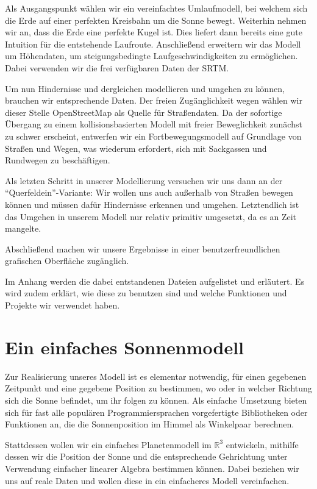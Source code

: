 \documentclass[
    paper=a4,
    DIV14,
    fontsize=12pt,
    pagesize=pdftex,
    toc=bibliographynumbered
]{scrartcl}
\numberwithin{figure}{section}
\numberwithin{equation}{section}
\numberwithin{table}{section}
\newcommand*\setR{\mathds{R}}
\begin{document}
Als Ausgangspunkt wählen wir ein vereinfachtes Umlaufmodell, bei welchem sich die Erde
auf einer perfekten Kreisbahn um die Sonne bewegt. Weiterhin nehmen wir an, dass die Erde
eine perfekte Kugel ist. Dies liefert dann bereits eine gute Intuition für die
entstehende Laufroute. Anschließend erweitern wir das Modell um Höhendaten, um
steigungsbedingte Laufgeschwindigkeiten zu ermöglichen. Dabei verwenden wir die frei
verfügbaren Daten der SRTM.

Um nun Hindernisse und dergleichen modellieren und umgehen zu können, brauchen wir
entsprechende Daten. Der freien Zugänglichkeit wegen wählen wir dieser Stelle
OpenStreetMap als Quelle für Straßendaten. Da der sofortige Übergang zu einem
kollisionsbasierten Modell mit freier Beweglichkeit zunächst zu schwer erscheint,
entwerfen wir ein Fortbewegungsmodell auf Grundlage von Straßen und Wegen, was wiederum
erfordert, sich mit Sackgassen und Rundwegen zu beschäftigen.

Als letzten Schritt in unserer Modellierung versuchen wir uns dann an der
\enquote{Querfeldein}-Variante: Wir wollen uns auch außerhalb von Straßen bewegen
können und müssen dafür Hindernisse erkennen und umgehen. Letztendlich ist das Umgehen in
unserem Modell nur relativ primitiv umgesetzt, da es an Zeit mangelte.

Abschließend machen wir unsere Ergebnisse in einer benutzerfreundlichen grafischen
Oberfläche zugänglich.

Im Anhang werden die dabei entstandenen Dateien aufgelistet und erläutert. Es wird zudem
erklärt, wie diese zu benutzen sind und welche Funktionen und Projekte wir verwendet haben.

\section{Ein einfaches Sonnenmodell}
Zur Realisierung unseres Modell ist es elementar notwendig, für einen gegebenen Zeitpunkt
und eine gegebene Position zu bestimmen, wo oder in welcher Richtung sich die Sonne
befindet, um ihr folgen zu können. Als einfache Umsetzung bieten sich für fast alle
populären Programmiersprachen vorgefertigte Bibliotheken oder Funktionen an, die die
Sonnenposition im Himmel als Winkelpaar berechnen.

Stattdessen wollen wir ein einfaches Planetenmodell im $\setR^3$ entwickeln, mithilfe
dessen wir die Position der Sonne und die entsprechende Gehrichtung unter Verwendung
einfacher linearer Algebra bestimmen können. Dabei beziehen wir uns auf reale Daten und
wollen diese in ein einfacheres Modell vereinfachen.
\end{document}
